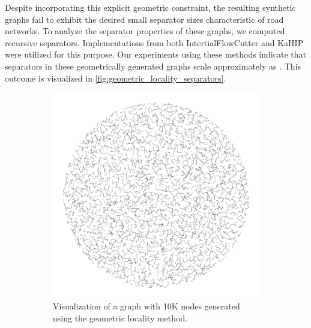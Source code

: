 Despite incorporating this explicit geometric constraint, the resulting synthetic graphs fail to exhibit the desired small separator sizes characteristic of road networks.
To analyze the separator properties of these graphs, we computed recursive separators.
Implementations from both IntertialFlowCutter and KaHIP were utilized for this purpose.
Our experiments using these methods indicate that separators in these geometrically generated graphs scale approximately as .
This outcome is visualized in \cref{fig:geometric_locality_separators}.

\begin{figure}[tbhp]
    \begin{subfigure}{0.35\linewidth}
        \centering
        \includegraphics[width=\linewidth]{graphics/local_embedding.png}
        \caption{Visualization of a graph with 10K nodes generated using the geometric locality method.}
        \label{fig:geometric_locality_graph_viz}
    \end{subfigure}
    \hfill
    \begin{subfigure}{0.55\linewidth}
        \centering

\end{subfigure}
\end{figure}
